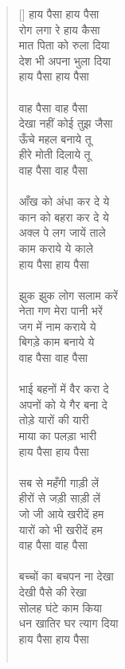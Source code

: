 \begin{verse}[\versewidth]\texthindi{
हाय पैसा हाय पैसा\\
रोग लगा रे हाय कैसा\\
मात पिता को रुला दिया\\
देश भी अपना भुला दिया\\
हाय पैसा हाय पैसा\\
\\
वाह पैसा वाह पैसा\\
देखा नहीं कोई तुझ जैसा\\
ऊँचे महल बनाये तू\\
हीरे मोती दिलाये तू\\
वाह पैसा वाह पैसा\\
\\
आँख को अंधा कर दे ये\\
कान को बहरा कर दे ये\\
अक्ल पे लग जायें ताले\\
काम कराये ये काले\\
हाय पैसा हाय पैसा\\
\\
झुक झुक लोग सलाम करें\\
नेता गण मेरा पानी भरें\\
जग में नाम कराये ये\\
बिगड़े काम बनाये ये\\
वाह पैसा वाह पैसा\\
\\
भाई बहनों में वैर करा दे\\
अपनों को ये गैर बना दे\\
तोड़े यारों की यारी\\
माया का पलड़ा भारी\\
हाय पैसा हाय पैसा\\
\\
सब से महँगी गाड़ी लें\\
हीरों से जड़ी साड़ी लें\\
जो जी आये खरीदें हम\\
यारों को भी खरीदें हम\\
वाह पैसा वाह पैसा\\
\\
बच्चों का बचपन ना देखा\\
देखी पैसे की रेखा\\
सोलह घंटे काम किया\\
धन खातिर घर त्याग दिया\\
हाय पैसा हाय पैसा\\
\\
}
\end{verse}
